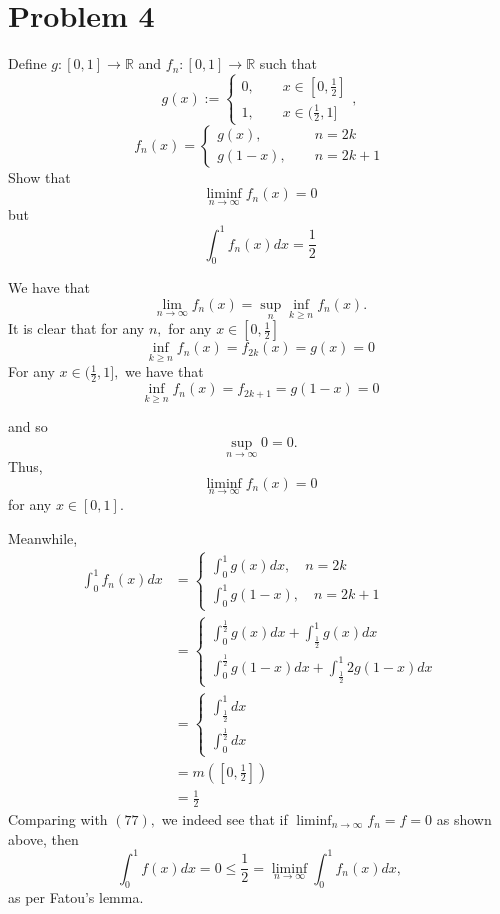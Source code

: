 \documentclass[11pt]{article}
\newcommand{\bbR}{\mathbb{R}}
\begin{document}
\section*{Problem 4}
\begin{problem}
    Define $g: [0,1] \to \bbR$ and $f_n: [0, 1] \to \bbR$ such that
    \[g(x) := \begin{cases}
        0, \qquad x \in [0, \frac{1}{2}]\\
        1, \qquad x \in (\frac{1}{2}, 1]
    \end{cases},\]
    \[f_{n}(x) = 
    \begin{cases}
        g(x), \quad \:\;\:\qquad n = 2k\\
        g(1-x), \qquad n = 2k + 1
    \end{cases}\]
    Show that 
    \[\liminf_{n\to \infty}f_n(x) = 0\] but 
    \[\int_0^1 f_n(x)dx = \frac{1}{2}\]
\end{problem}
\begin{solution}
    We have that 
    \[\lim_{n\to \infty}f_n(x) = \sup_{n}\inf_{k\geq n}f_n(x).\] It is clear that for any $n,$ for any $x \in [0,\frac{1}{2}]$ 
    \[\inf_{k \geq n} f_n(x) = f_{2k}(x) = g(x) = 0\] For any $x\in (\frac{1}{2}, 1],$ we have that 
    \[\inf_{k\geq n}f_n(x) = f_{2k+1} = g(1-x) = 0\]
    
    and so 
    \[\sup_{n\to \infty } 0 = 0.\] Thus, \[\liminf_{n\to \infty}f_n(x) = 0\] for any $x\in [0,1].$ 

    Meanwhile, 
    \begin{align*}
    \int_0^1 f_n(x)dx &= \begin{cases}
        \int_0^1 g(x)dx, \quad n = 2k\\
        \int_0^1 g(1-x), \quad n = 2k+1
    \end{cases}\\ &=
    \begin{cases}
        \int_0^\frac{1}{2} g(x)dx + \int_\frac{1}{2}^1 g(x)dx\\
        \int_0^\frac{1}{2} g(1-x)dx + \int_\frac{1}{2}^1{2} g(1-x)dx
    \end{cases}\\ &= \begin{cases}
        \int_\frac{1}{2}^1 dx\\
        \int_0^\frac{1}{2} dx
    \end{cases}\\ &=m([0,\frac{1}{2}])  \\
    &= \frac{1}{2}
    \end{align*}
Comparing with $(77),$ we indeed see that if $\liminf_{n\to \infty}f_n = f = 0$ as shown above, then 
\[\int_0^1 f(x) dx = 0 \leq \frac{1}{2} = \liminf_{n\to \infty}\int_0^1 f_n(x) dx,\] as per Fatou's lemma.
\end{solution}
\end{document}
